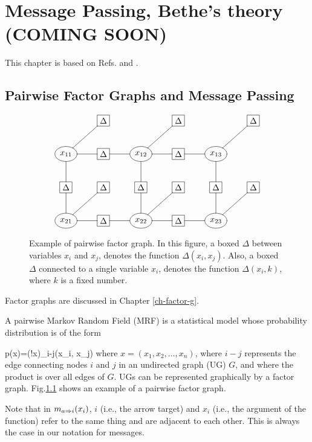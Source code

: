 \chapter{Message Passing, Bethe's theory
(COMING SOON)}
\label{ch-mpass-bethe}

\newcommand{\ttheta}[0]{\TIL{\theta}}
\newcommand{\tP}[0]{\TIL{p}}

This chapter is based
on Refs. \cite{WainJordan}
and \cite{yedidia}.

\section{Pairwise Factor
Graphs and Message Passing}


\begin{figure}[h!]
$$\xymatrix{
&*+[F]{\Delta}
&
&*+[F]{\Delta}
&
&*+[F]{\Delta}
\\
*++[o][F]{x_{11}}
\ar@{-}[d]\ar@{-}[r]\ar@{-}[ru]
&*+[F]{\Delta}\ar@{-}[r]
&*++[o][F]{x_{12}}\ar@{-}[d]\ar@{-}[r]
\ar@{-}[ru]
&*+[F]{\Delta}\ar@{-}[r]
&*++[o][F]{x_{13}}\ar@{-}[d]
\ar@{-}[ru]
\\
*+[F]{\Delta}\ar@{-}[d]
&*+[F]{\Delta}
&*+[F]{\Delta}\ar@{-}[d]
&*+[F]{\Delta}
&*+[F]{\Delta}\ar@{-}[d]
&*+[F]{\Delta}
\\
*++[o][F]{x_{21}}\ar@{-}[r]\ar@{-}[ru]
&*+[F]{\Delta}\ar@{-}[r]
&*++[o][F]{x_{22}}\ar@{-}[r]\ar@{-}[ru]
&*+[F]{\Delta}\ar@{-}[r]
&*++[o][F]{x_{23}}\ar@{-}[ru]
}$$
\caption{Example
of pairwise factor graph.
In this figure,
a boxed $\Delta$
between variables $x_i$
and $x_j$,
denotes the function
$\Delta(x_i, x_j)$.
Also, a boxed
$\Delta$
connected to a
single variable $x_i$,
denotes the function
$\Delta(x_i, k)$,
where $k$
is a fixed number.
}
\label{fig-paiwise-mrf}
\end{figure}

Factor graphs
are discussed in Chapter \ref{ch-factor-g}.

A pairwise
Markov Random Field (MRF)
is a statistical model 
whose probability
distribution
is of the form

\beq
p(x)=\caln(!x)\prod_{i-j}\Delta(x_i, x_j)
\label{eq-pairwise-fg}
\eeq
where $x=(x_1, x_2,
\ldots, x_n )$,
where $i-j$
represents the edge
connecting
nodes $i$ and $j$
in an undirected graph (UG) $G$,
and where  the product 
is over all edges of $G$.
UGs can be represented
graphically
by a factor graph.
Fig.\ref{fig-paiwise-mrf}
shows an example
of a pairwise
factor graph.



Note that 
in $m_{a\Rightarrow i}(x_i)$,
$i$ (i.e., the arrow target) 
and $x_i$ (i.e., the argument
of the function) 
refer to the same thing and
are adjacent to each other.
This is always the case in
our notation for messages.  


